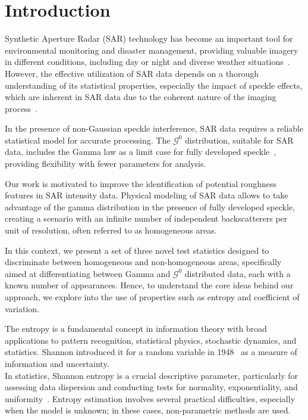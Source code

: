 \documentclass[remotesensing,article,submit,moreauthors,pdftex]{Definitions/mdpi}
\begin{document}

\setlength{\tabcolsep}{6pt} 
\newcommand{\bias}{\operatorname{Bias}}
\newcommand{\widebar}[1]{\overline{#1}}

\hypertarget{sec:Introduction}{%
\section{Introduction}\label{sec:Introduction}}

Synthetic Aperture Radar (SAR) technology has become an important tool
for environmental monitoring and disaster management, providing valuable
imagery in different conditions, including day or night and diverse
weather situations~\cite{Moreira2013,Mu2019}. However, the effective
utilization of SAR data depends on a thorough understanding of its
statistical properties, especially the impact of speckle effects, which
are inherent in SAR data due to the coherent nature of the imaging
process~\cite{Argenti2013}.

In the presence of non-Gaussian speckle interference, SAR data requires
a reliable statistical model for accurate processing. The
\(\mathcal{G}^0\) distribution, suitable for SAR data, includes the
Gamma law as a limit case for fully developed
speckle~\cite{Ferreira2020}, providing flexibility with fewer parameters
for analysis.

Our work is motivated to improve the identification of potential
roughness features in SAR intensity data. Physical modeling of SAR data
allows to take advantage of the gamma distribution in the presence of
fully developed speckle, creating a scenario with an infinite number of
independent backscatterers per unit of resolution, often referred to as
homogeneous areas.

In this context, we present a set of three novel test statistics
designed to discriminate between homogeneous and non-homogeneous areas,
specifically aimed at differentiating between Gamma and
\(\mathcal{G}^0\) distributed data, each with a known number of
appearances. Hence, to understand the core ideas behind our approach, we
explore into the use of properties such as entropy and coefficient of
variation.

The entropy is a fundamental concept in information theory with broad
applications to pattern recognition, statistical physics, stochastic
dynamics, and statistics. Shannon introduced it for a random variable in
1948~\cite{Shannon1948} as a measure of information and uncertainty.\\
In statistics, Shannon entropy is a crucial descriptive parameter,
particularly for assessing data dispersion and conducting tests for
normality, exponentiality, and
uniformity~\cite{Wieczorkowski1999,Zamanzade2012}. Entropy estimation
involves several practical difficulties, especially when the model is
unknown; in these cases, non-parametric methods are used.
\end{document}
